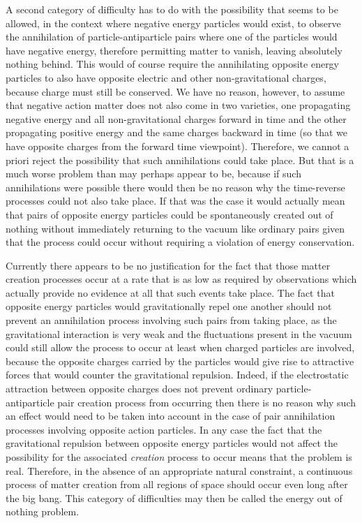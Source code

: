 \documentclass[notitlepage,12pt]{report}
\begin{document}
A second category of difficulty has to do with the possibility that seems to be allowed, in the context where negative energy particles would exist, to observe the annihilation of particle-antiparticle pairs where one of the particles would have negative energy, therefore permitting matter to vanish, leaving absolutely nothing behind. This would of course require the annihilating opposite energy particles to also have opposite electric and other non-gravitational charges, because charge must still be conserved. We have no reason, however, to assume that negative action matter does not also come in two varieties, one propagating negative energy and all non-gravitational charges forward in time and the other propagating positive energy and the same charges backward in time (so that we have opposite charges from the forward time viewpoint). Therefore, we cannot a priori reject the possibility that such annihilations could take place. But that is a much worse problem than may perhaps appear to be, because if such annihilations were possible there would then be no reason why the time-reverse processes could not also take place. If that was the case it would actually mean that pairs of opposite energy particles could be spontaneously created out of nothing without immediately returning to the vacuum like ordinary pairs given that the process could occur without requiring a violation of energy conservation.

Currently there appears to be no justification for the fact that those matter creation processes occur at a rate that is as low as required by observations which actually provide no evidence at all that such events take place. The fact that opposite energy particles would gravitationally repel one another should not prevent an annihilation process involving such pairs from taking place, as the gravitational interaction is very weak and the fluctuations present in the vacuum could still allow the process to occur at least when charged particles are involved, because the opposite charges carried by the particles would give rise to attractive forces that would counter the gravitational repulsion. Indeed, if the electrostatic attraction between opposite charges does not prevent ordinary particle-antiparticle pair creation process from occurring then there is no reason why such an effect would need to be taken into account in the case of pair annihilation processes involving opposite action particles. In any case the fact that the gravitational repulsion between opposite energy particles would not affect the possibility for the associated \textit{creation} process to occur means that the problem is real. Therefore, in the absence of an appropriate natural constraint, a continuous process of matter creation from all regions of space should occur even long after the big bang. This category of difficulties may then be called the energy out of nothing problem.
\end{document}
